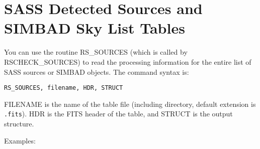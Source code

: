 \section{SASS Detected Sources and SIMBAD Sky List Tables}
 
You can use the routine RS{\_}SOURCES (which is called by RSCHECK{\_}SOURCES) to read
the processing information for the entire list of SASS sources or SIMBAD
objects. The command syntax is:

\medskip\noindent
\begin{verbatim}
RS_SOURCES, filename, HDR, STRUCT
\end{verbatim}
FILENAME is the name of the table file (including directory, default extension
is {\tt .fits}). HDR is the FITS header of the table, and STRUCT is the output
structure.
 
Examples:

